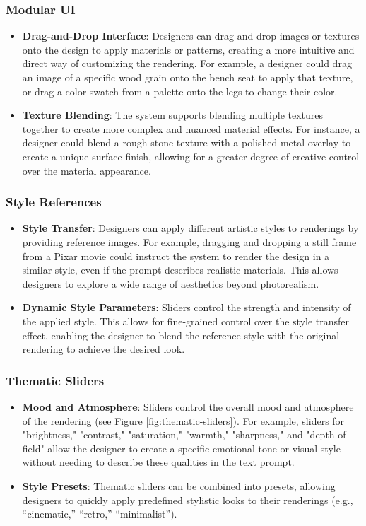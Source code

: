 \documentclass{article}
\begin{document}
\subsubsection{Modular UI}
\begin{itemize}
\item \textbf{Drag-and-Drop Interface}: Designers can drag and drop images or textures onto the design to apply materials or patterns, creating a more intuitive and direct way of customizing the rendering. For example, a designer could drag an image of a specific wood grain onto the bench seat to apply that texture, or drag a color swatch from a palette onto the legs to change their color.
\item \textbf{Texture Blending}: The system supports blending multiple textures together to create more complex and nuanced material effects. For instance, a designer could blend a rough stone texture with a polished metal overlay to create a unique surface finish, allowing for a greater degree of creative control over the material appearance.
\end{itemize}

\subsubsection{Style References}
\begin{itemize}
\item \textbf{Style Transfer}: Designers can apply different artistic styles to renderings by providing reference images. For example, dragging and dropping a still frame from a Pixar movie could instruct the system to render the design in a similar style, even if the prompt describes realistic materials. This allows designers to explore a wide range of aesthetics beyond photorealism.
\item \textbf{Dynamic Style Parameters}: Sliders control the strength and intensity of the applied style. This allows for fine-grained control over the style transfer effect, enabling the designer to blend the reference style with the original rendering to achieve the desired look.
\end{itemize}

\subsubsection{Thematic Sliders}
\begin{itemize}
\item \textbf{Mood and Atmosphere}: Sliders control the overall mood and atmosphere of the rendering (see Figure \ref{fig:thematic-sliders}). For example, sliders for "brightness," "contrast," "saturation," "warmth," "sharpness," and "depth of field" allow the designer to create a specific emotional tone or visual style without needing to describe these qualities in the text prompt.
\item \textbf{Style Presets}: Thematic sliders can be combined into presets, allowing designers to quickly apply predefined stylistic looks to their renderings (e.g., “cinematic,” “retro,” “minimalist”).
\end{itemize}
\end{document}
